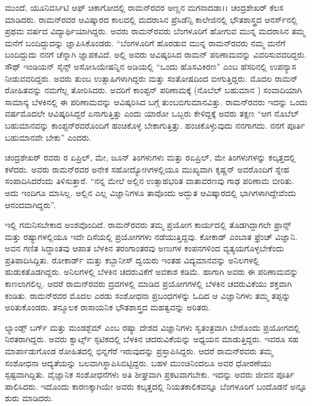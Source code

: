 ಮುಂದೆ, ಯೂನಿವರ್ಸಿಟಿ ಆಫ್ ಚಿಕಾಗೋದಲ್ಲಿ ರಾಮನ್‍ರವರ ಅಣ್ಣನ ಮಗನಾದ\break ಡಾ।। ಚಂದ್ರಶೇಖರ್ ಕೆಲಸ ಮಾಡಿದರು. ರಾಮನ್‍ರವರ ಆವಿಷ್ಕಾರದ ಕಾಲದಲ್ಲಿ ಮದರಾಸಿನ ಪ್ರೆಸಿಡೆನ್ಸಿ ಕಾಲೇಜಿನಲ್ಲಿ ಭೌತಶಾಸ್ತ್ರದ ಆನರ್ಸ್‌ನಲ್ಲಿ ಪ್ರಥಮ ವರ್ಷದ ವಿದ್ಯಾರ್ಥಿಯಾಗಿದ್ದರು. ಅವರು ರಾಮನ್‍ರವರು ಬೆಂಗಳೂರಿಗೆ ಹೋಗುವ ಮುನ್ನ ಮದರಾಸಿನ ತಮ್ಮ ಮನೆಗೆ ಬಂದಿದ್ದುದನ್ನು ಜ್ಞಾಪಿಸಿಕೊಂಡರು. “ಬೆಂಗಳೂರಿಗೆ ಹೊರಡುವ ಮುನ್ನ ರಾಮನ್‍ರವರು ನಮ್ಮ ಮನೆಗೆ ಬಂದಿದ್ದುದು ನನಗೆ ಚೆನ್ನಾಗಿ ಜ್ಞಾಪಕವಿದೆ. ಅಲ್ಲಿ ಅವರು ಆವಿಷ್ಕರಿಸಿದ ರಾಮನ್ ಪರಿಣಾಮವನ್ನು ವಿವರಿಸುವವ\-ರಿದ್ದರು. ಸೌಥ್ ಇಂಡಿಯನ್ ಸೈನ್ಸ್ ಅಸೋಸಿಯೇಷನ್ನಿನ ಅಡಿಯಲ್ಲಿ “ಒಂದು ಹೊಸವಿಕಿರಣ” ಎಂಬ ಹೆಸರಿನಲ್ಲಿ ಉಪನ್ಯಾಸ ನೀಡುವವರಿದ್ದರು. ಅವರು ತುಂಬ ಉತ್ಸಾಹಿಗಳಾಗಿದ್ದರು ಮತ್ತು ಸಂತೋಷದಿಂದ ಬೀಗುತ್ತಿದ್ದರು. ಮೊದಲ ರಾಮನ್ ರೋಹಿತವನ್ನು ನಮಗೆಲ್ಲ ತೋರಿಸಿದರು. ಅವರಿಗೆ ಕಾಂಪ್ಟನ್ ಪರಿಣಾಮಕ್ಕೆ (ನೊಬೆಲ್ ಬಹುಮಾನ ) ಸಂವಾದಿಯಾಗಿ ಸಾಮಾನ್ಯ ಬೆಳಕಿನಲ್ಲಿ ಈ ಪರಿಣಾಮವನ್ನು ಆವಿಷ್ಕರಿಸಿದ ಬಗ್ಗೆ ತುಂಬ\break ಬಿಗುಮಾನವಿತ್ತು. ರಾಮನ್‍ರವರು ಇದನ್ನು ಒಂದು ವರ್ಷಮೊದಲೇ ಆವಿಷ್ಕರಿಸಿದ್ದರೆ ಏನಾಗುತ್ತಿತ್ತು ಎಂದು ಯಾರೋ ಒಬ್ಬರು ಕೇಳಿದ್ದಕ್ಕೆ ಅವರು ತಕ್ಷಣ “ಆಗ ನೊಬೆಲ್ ಬಹುಮಾನವನ್ನು ಕಾಂಪ್ಟನ್‍\-ರವರೊಂದಿಗೆ ಹಂಚಿಕೊಳ್ಳ ಬೇಕಾಗುತ್ತಿತ್ತು. ಹಂಚಿಕೊಳ್ಳುವುದು ನನಗಾಗದು. ನನಗೆ ಪೂರ್ತಿ ಬಹುಮಾನವೇ ಬೇಕು” ಎಂದರು. 

ಚಂದ್ರಶೇಖರ್ ರವರು  ರ ಏಪ್ರಿಲ್, ಮೇ, ಜೂನ್ ತಿಂಗಳುಗಳು ಮತ್ತು  ರ\break ಏಪ್ರಿಲ್, ಮೇ ತಿಂಗಳುಗಳನ್ನು ಕಲ್ಕತ್ತದಲ್ಲಿ ಕಳೆದರು. ಅವರು ರಾಮನ್‍ರವರ ಅನೇಕ ಸಹೋದ್ಯೋಗಿ\-ಗಳಲ್ಲಿಯೂ ಮುಖ್ಯವಾಗಿ ಕೃಷ್ಣನ್ ಅವರೊಂದಿಗೆ ಸ್ನೇಹ ಸಂಪಾದಿಸಿದರೆಂದು ತಿಳಿಸುತ್ತಾರೆ. “ನನ್ನ ಮೇಲೆ ಅಲ್ಲಿನ ಉತ್ಸಾಹಭರಿತ ವಾತಾವರಣವು ಗಾಢ ಪರಿಣಾಮ ಬೀರಿತು. ಅದು ಇಂದಿಗೂ ಮಾಸಿಲ್ಲ. ಅಲ್ಲಿನ ಎಲ್ಲ ವಿಜ್ಞಾನಿಗಳೂ ತಾವೊಂದು ಅದ್ಭುತ ಆವಿಷ್ಕಾರದಲ್ಲಿ ಭಾಗಿಗಳಾಗಿದ್ದೇವೆಂದು ಆನಂದವಾಗಿದ್ದರು”.

ಇಲ್ಲಿ ಗಮನಿಸಬೇಕಾದ ಅಂಶವೊಂದಿದೆ. ರಾಮನ್‍ರವರು ತಮ್ಮ ಪ್ರಯೋಗ ಕಾರ್ಯದಲ್ಲಿ ತೊಡಗಿದ್ದಾಗಲೇ ಫ್ರಾನ್ಸ್ ಮತ್ತು ರಷ್ಯಾಗಳಲ್ಲಿಯೂ ಇದೇ ದಿಸೆಯಲ್ಲಿ ಪ್ರಯೋಗಗಳು ನಡೆಯುತ್ತಿದ್ದವು. ಕೋಕಾಡ್ ಎಂಬಾತ ಫ್ರೆಂಚ್ ವಿಜ್ಞಾನಿ. ಅವನ ಗಣಿತ ಸಿದ್ಧಾಂತವು ಆಪಾತ ಬೆಳಕಿನ ತರಂಗಾಂತರವು ಅಣುಗಳ ಕಂಪನಗಳಿಂದ ವ್ಯತ್ಯಯಗೊಳ್ಳಬೇಕೆಂದು ಪ್ರತಿಪಾದಿಸಿದ್ದಿತು. ರೋಕಾರ್ಡ್ ಮತ್ತು ಕಬ್ಬಾನೀಸ್ ದ್ವಯರು ಇಂತಹ ವಿದ್ಯಮಾನವನ್ನು ಅನಿಲಗಳಲ್ಲಿ ಹುಡುಕತೊಡಗಿದ್ದರು. ಅನಿಲಗಳಲ್ಲಿ ಬೆಳಕಿನ ಚದರುವಿಕೆಗೆ ಅವಕಾಶ ಕಡಿಮೆ. ಹಾಗಾಗಿ ಅವರು ಈ ಪರಿಣಾಮವನ್ನು ಕಾಣಲಾಗಲಿಲ್ಲ. ಆದರೆ ರಾಮನ್‍ರವರು ದ್ರವಗಳಲ್ಲಿ ಮಾಡಿದ ಪ್ರಯೋಗಗಳಲ್ಲಿ ಬೆಳಕಿನ ಚದರುವಿಕೆಯು ಶಕ್ತವಾಗಿ ಕಂಡಿತು. ರಾಮನ್‍ರವರ ಮೊದಲ ಎರಡು ಸಂಶೋಧನಾ ಪ್ರಬಂಧಗಳನ್ನು ಓದಿದ ಆ ವಿಜ್ಞಾನಿಗಳು ತಮ್ಮ ತಪ್ಪನ್ನು ಅರಿತುಕೊಂಡರು. ತನ್ಮೂಲಕ ರಾಸಾಯನಿಕ ಭೌತಶಾಸ್ತ್ರದ ಮಹತ್ವವನ್ನು ಅರಿತರು.

ಲ್ಯಾಂಡ್ಸ್ ಬರ್ಗ್ ಮತ್ತು ಮಂಡಶ್ಬೆಮ್ ಎಂಬ ರಷ್ಯಾ ದೇಶದ ವಿಜ್ಞಾನಿಗಳು ಸ್ವತಂತ್ರವಾಗಿ ಬೇರೊಂದು ಪ್ರಯೋಗದಲ್ಲಿ ನಿರತರಾಗಿದ್ದರು. ಅವರು ಕ್ವಾರ್ಟ್ಸ್ ಸ್ಫಟಿಕದಲ್ಲಿ ಬೆಳಕಿನ ಚದರುವಿಕೆಯನ್ನು ಅಧ್ಯಯನ ಮಾಡುತ್ತಿದ್ದರು. ಇವರೂ ಸಹ ಮಾರ್ಪಾಡುಗೊಂಡ ರೋಹಿತದಲ್ಲಿ ಭಿನ್ನಗೆರೆ ಇರುವುದನ್ನು ಪ್ರಸ್ತಾಪಿಸಿದ್ದರು. ಆದರೆ ರಾಮನ್‍ರವರು ತಮ್ಮ ಸಂಶೋಧನಾ ಆದ್ಯತೆಯನ್ನು ಬಲವಾಗಿ\break ಸ್ಥಾಪಿಸಿಬಿಟ್ಟಿದ್ದರು. ಬಹಳ ಮುಂಚಿನಿಂದಲೂ ಅವರ ಧೋರಣೆಯು ಸ್ಪಷ್ಟವಾಗಿದ್ದಿತು. ವೈಜ್ಞಾನಿಕ ಸಂಶೋಧನೆಗಳು ಅತಿ ಶೀಘ್ರವಾಗಿ ಪ್ರಕಟವಾಗಬೇಕು. ಇದನ್ನು ಅವರು ಜೀವನ ಪೂರ್ತಿ ಪಾಲಿಸಿದರು. ಇದೊಂದು ಕಾರಣಕ್ಕಾಗಿಯೇ ಅವರು ಕಲ್ಕತ್ತದಲ್ಲಿ \textit{} ನಿಯತಕಾಲಿಕವನ್ನೂ ಬೆಂಗಳೂರಿಗೆ ಬಂದೊಡನೆ \textit{} ಅನ್ನೂ ಶುರು ಮಾಡಿದರು.

